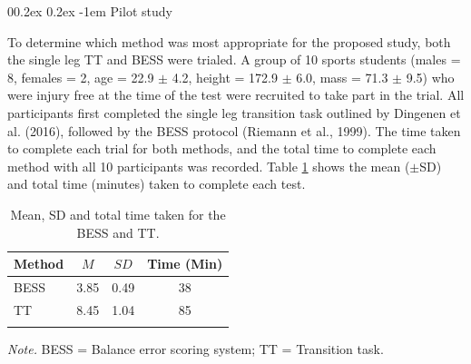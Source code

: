 \documentclass[
  english,
  man,floatsintext]{apa6}
\makeatletter
\renewcommand{\paragraph}{\@startsection{paragraph}{4}{\parindent}%
  {0\baselineskip \@plus 0.2ex \@minus 0.2ex}%
  {-1em}%
  {\normalfont\normalsize\bfseries\itshape\typesectitle}}
\makeatother
\begin{document}
\hypertarget{pilot-study-1}{%
\paragraph{Pilot study}\label{pilot-study-1}}

To determine which method was most appropriate for the proposed study, both the single leg TT and BESS were trialed.
A group of 10 sports students (males = 8, females = 2, age = 22.9 \(\pm\) 4.2, height = 172.9 \(\pm\) 6.0, mass = 71.3 \(\pm\) 9.5) who were injury free at the time of the test were recruited to take part in the trial.
All participants first completed the single leg transition task outlined by Dingenen et al. (2016), followed by the BESS protocol (Riemann et al., 1999).
The time taken to complete each trial for both methods, and the total time to complete each method with all 10 participants was recorded.
Table \ref{tab:balancetimes} shows the mean (\(\pm\)SD) and total time (minutes) taken to complete each test.

\begin{table}[H]

\begin{center}
\begin{threeparttable}

\caption{\label{tab:balancetimes}Mean, SD and total time taken for the BESS and TT.}

\begin{tabular}{lccc}
\toprule
Method & $M$ & $SD$ & Time (Min)\\
\midrule
BESS & 3.85 & 0.49 & 38\\
TT & 8.45 & 1.04 & 85\\
\bottomrule
\addlinespace
\end{tabular}

\begin{tablenotes}[para]
\normalsize{\textit{Note.} BESS = Balance error scoring system; TT = Transition task.}
\end{tablenotes}

\end{threeparttable}
\end{center}

\end{table}
\end{document}
